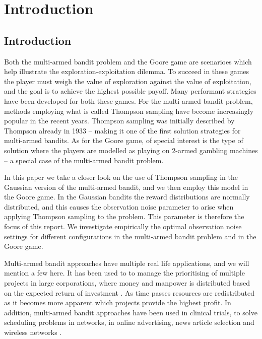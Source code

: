 \chapter{Introduction}
\label{ch:introduction}

\section{Introduction}
Both the multi-armed bandit problem and the Goore game are scenarioes which help illustrate the exploration-exploitation dilemma.
To succeed in these games the player must weigh the value of exploration against the value of exploitation, and the goal is to achieve the highest possible payoff.
Many performant strategies have been developed for both these games.
For the multi-armed bandit problem, methods employing what is called Thompson sampling \cite{Thompson1933} have become increasingly popular in the recent years.
Thompson sampling was initially described by Thompson already in 1933 -- making it one of the first solution strategies for multi-armed bandits.
As for the Goore game, of special interest is the type of solution where the players are modelled as playing on 2-armed gambling machines -- a special case of the multi-armed bandit problem.

In this paper we take a closer look on the use of Thompson sampling in the Gaussian version of the multi-armed bandit, and we then employ this model in the Goore game.
In the Gaussian bandits the reward distributions are normally distributed, and this causes the observation noise parameter \ob{} to arise when applying Thompson sampling to the problem.
This parameter is therefore the focus of this report.
We investigate empirically the optimal observation noise settings for different configurations in the multi-armed bandit problem and in the Goore game.

Multi-armed bandit approaches have multiple real life applications, and we will mention a few here.
It has been used to to manage the prioritising of multiple projects in large corporations, where money and manpower is distributed based on the expected return of investment \cite{Glimsdal12}.
As time passes resources are redistributed as it becomes more apparent which projects provide the highest profit.
In addition, multi-armed bandit approaches have been used in clinical trials, to solve scheduling problems in networks, in online advertising, news article selection and wireless networks \cite{Granmo07, Glimsdal12}.

